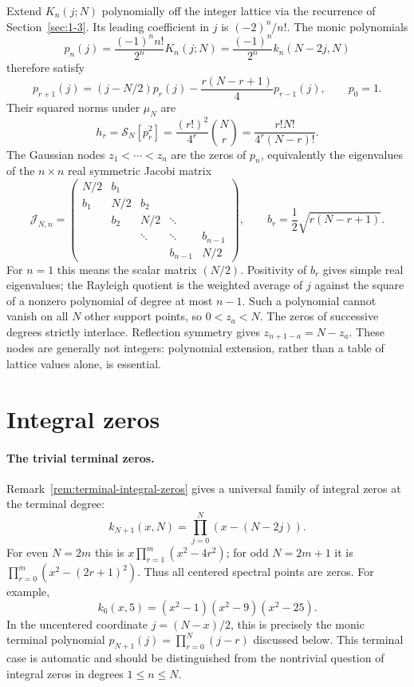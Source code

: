 Extend $K_n(j;N)$ polynomially off the integer lattice via the recurrence of Section~\ref{sec:1-3}. Its leading coefficient in $j$ is $(-2)^n/n!$. The monic polynomials
\[
p_n(j)=\frac{(-1)^n n!}{2^n}K_n(j;N)
=\frac{(-1)^n}{2^n}k_n(N-2j,N)
\]
therefore satisfy
\begin{equation}\label{eq:quadrature-monic-recurrence}
p_{r+1}(j)=(j-N/2)p_r(j)-\frac{r(N-r+1)}4p_{r-1}(j),\qquad p_0=1.
\end{equation}
Their squared norms under $\mu_N$ are
\begin{equation}\label{eq:quadrature-monic-norm}
h_r=\mathcal S_N[p_r^2]=\frac{(r!)^2}{4^r}\binom Nr
=\frac{r!N!}{4^r(N-r)!}.
\end{equation}
The Gaussian nodes $z_1<\cdots<z_n$ are the zeros of $p_n$, equivalently the eigenvalues of the $n\times n$ real symmetric Jacobi matrix
\begin{equation}\label{eq:quadrature-Jacobi}
\mathcal J_{N,n}=\begin{pmatrix}
N/2&b_1& & &\\
b_1&N/2&b_2& &\\
 &b_2&N/2&\ddots&\\
 & &\ddots&\ddots&b_{n-1}\\
 & & &b_{n-1}&N/2
\end{pmatrix},\qquad b_r=\frac12\sqrt{r(N-r+1)}.
\end{equation}
For $n=1$ this means the scalar matrix $(N/2)$. Positivity of $b_r$ gives simple real eigenvalues; the Rayleigh quotient is the weighted average of $j$ against the square of a nonzero polynomial of degree at most $n-1$. Such a polynomial cannot vanish on all $N$ other support points, so $0<z_a<N$. The zeros of successive degrees strictly interlace. Reflection symmetry gives
$z_{n+1-a}=N-z_a$.
These nodes are generally not integers: polynomial extension, rather than a table of lattice values alone, is essential.

\section{Integral zeros}
\label{sec:17-2}
\paragraph{The trivial terminal zeros.}
Remark~\ref{rem:terminal-integral-zeros} gives a universal family of integral zeros at the terminal degree:
\[
k_{N+1}(x,N)=\prod_{j=0}^{N}(x-(N-2j)).
\]
For even $N=2m$ this is $x\prod_{r=1}^{m}(x^2-4r^2)$; for odd $N=2m+1$ it is $\prod_{r=0}^{m}(x^2-(2r+1)^2)$. Thus all centered spectral points are zeros. For example,
\[
k_6(x,5)=(x^2-1)(x^2-9)(x^2-25).
\]
In the uncentered coordinate $j=(N-x)/2$, this is precisely the monic terminal polynomial $p_{N+1}(j)=\prod_{r=0}^{N}(j-r)$ discussed below. This terminal case is automatic and should be distinguished from the nontrivial question of integral zeros in degrees $1\le n\le N$.

